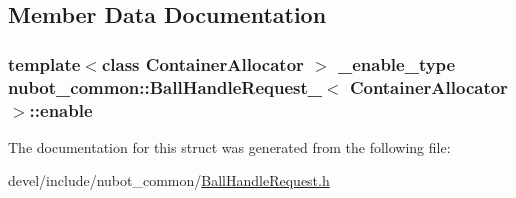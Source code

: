 \subsection{Member Data Documentation}
\hypertarget{structnubot__common_1_1BallHandleRequest___aa59f30a8b094faeac0be2efc0da97799}{
\subsubsection[{enable}]{\setlength{\rightskip}{0pt plus 5cm}template$<$class Container\-Allocator $>$ {\bf \-\_\-enable\-\_\-type} {\bf nubot\-\_\-common\-::\-Ball\-Handle\-Request\-\_\-}$<$ Container\-Allocator $>$\-::enable}}\label{structnubot__common_1_1BallHandleRequest___aa59f30a8b094faeac0be2efc0da97799}


The documentation for this struct was generated from the following file\-:\begin{DoxyCompactItemize}
\item 
devel/include/nubot\-\_\-common/\hyperlink{BallHandleRequest_8h}{Ball\-Handle\-Request.\-h}\end{DoxyCompactItemize}

